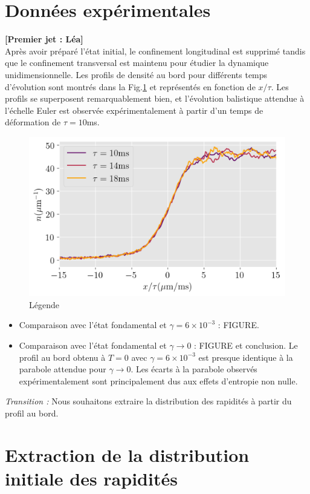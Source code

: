 \documentclass[submission, Phys]{SciPost}
\begin{document}
{\color{blue}

\section*{Données expérimentales}
{\bf [Premier jet : Léa]}\\
Après avoir préparé l'état initial, le confinement longitudinal est supprimé tandis que le confinement transversal est maintenu pour étudier la dynamique unidimensionnelle. Les profils de densité au bord pour différents temps d'évolution sont montrés dans la Fig.\ref{fig:euler} et représentés en fonction de $x /\tau$. Les profils se superposent remarquablement bien, et l'évolution balistique attendue à l'échelle Euler est observée expérimentalement à partir d'un temps de déformation de $\tau = 10$ms. 

\begin{figure}[!htb]
    \centering
    \includegraphics[width=0.7\linewidth]{Figures/Hydroscaling_DWD.png}
    \caption{Légende}
    \label{fig:euler}
\end{figure}

\begin{itemize}
    \item Comparaison avec l'état fondamental et $\gamma = 6 \times 10^{-3}$ : FIGURE.
    \item Comparaison avec l'état fondamental et $\gamma \to 0$ : FIGURE et conclusion. Le profil au bord obtenu à $T=0$ avec $\gamma = 6 \times 10^{-3}$ est presque identique à la parabole attendue pour $\gamma \to 0$. Les écarts à la parabole observés expérimentalement sont principalement dus aux effets d'entropie non nulle.
\end{itemize}

\textit{Transition :} Nous souhaitons extraire la distribution des rapidités à partir du profil au bord.

\section*{Extraction de la distribution initiale des rapidités}

}
\end{document}
